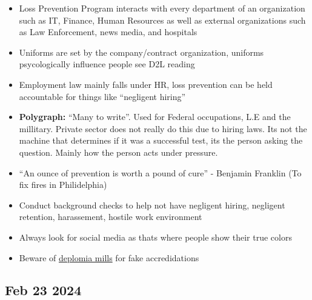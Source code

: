 \documentclass[12pt]{article}
\begin{document}
\begin{itemize}
		   \item Loss Prevention Program interacts with every department of an organization such as IT, Finance,
		  		Human Resources as well as external organizations such as Law Enforcement, news media, and hospitals
			\item Uniforms are set by the company/contract organization, uniforms psycologically influence
				people see D2L reading
			\item Employment law mainly falls under HR, loss prevention can be held accountable for things like
				``negligent hiring''
			\item \textbf{Polygraph:} ``Many to write''. Used for Federal occupations, L.E and the millitary.
				Private sector does not really do this due to hiring laws. Its not the machine that determines
				if it was a successful test, its the person asking the question. Mainly how the person acts under
				pressure.
			\item ``An ounce of prevention is worth a pound of cure'' - Benjamin Franklin 
				(To fix fires in Philidelphia)
		   \item Conduct background checks to help not have negligent hiring, negligent retention, harassement,
				hostile work environment
			\item Always look for social media as thats where people show their true colors
			\item Beware of \underline{deplomia mills} for fake accredidations
\end{itemize}

\subsection*{Feb 23 2024}
\end{document}
